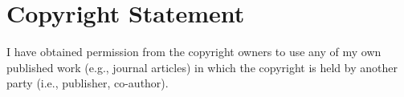 \chapter*{Copyright Statement} 

I have obtained permission from the copyright owners to use any of my own published work (e.g., journal articles) in which the copyright is held by another party (i.e., publisher, co-author).